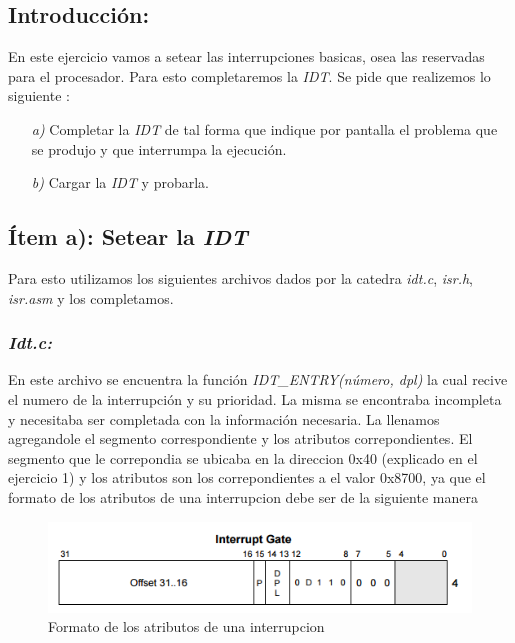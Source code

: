 \subsection{Introducción:}

En este ejercicio vamos a setear las interrupciones basicas, osea las reservadas para el procesador. Para esto completaremos la \textit{IDT}. Se pide que realizemos lo siguiente :

\begin{itemize}
\item [\textit{a)}] Completar la \textit{IDT} de tal forma que indique por pantalla el problema que se produjo y que interrumpa la ejecución.
\item [\textit{b)}] Cargar la  \textit{IDT} y probarla.
\end{itemize}

\subsection{Ítem a): Setear la \textit{IDT}}

Para esto utilizamos los siguientes archivos dados por la catedra   \textit{idt.c}, \textit{isr.h}, \textit{isr.asm} y los completamos. 

 \subsubsection{{\large \textit{Idt.c:}}}
 En este archivo se encuentra la función \textit{IDT\_ENTRY(número, dpl)} la cual recive el numero de la interrupción y su prioridad. La misma se encontraba incompleta y necesitaba ser completada con la información necesaria. La llenamos agregandole el segmento correspondiente y los atributos correpondientes. El segmento que le correpondia se ubicaba en la direccion 0x40 (explicado en el ejercicio 1) y los atributos son los correpondientes a el valor  0x8700, ya que el formato de los atributos de una interrupcion debe ser de la siguiente manera 

 \begin{figure}[H]
\begin{center}
  \includegraphics[width=\linewidth]{ejercicio2/interrupcion.png}
  \caption{{\small Formato de los atributos de una interrupcion} }
\endminipage
\end{center}
\end{figure}

